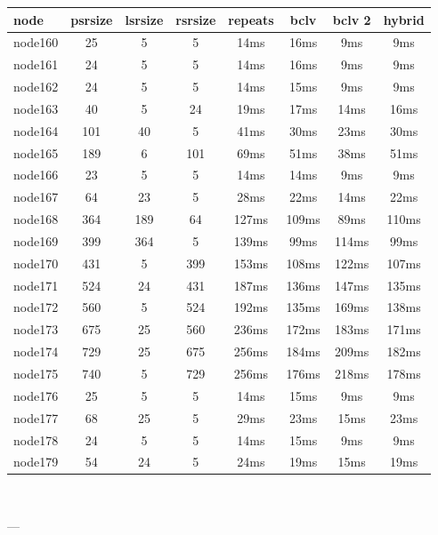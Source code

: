 \begin{tabular}{|l|c|c|c|c|c|c|c|}
\hline node & psrsize & lsrsize & rsrsize   & repeats & bclv & bclv 2 & hybrid\\
    \hline node160 & 25 & 5 & 5 & 14ms & 16ms & 9ms & 9ms\\
    \hline node161 & 24 & 5 & 5 & 14ms & 16ms & 9ms & 9ms\\
    \hline node162 & 24 & 5 & 5 & 14ms & 15ms & 9ms & 9ms\\
    \hline node163 & 40 & 5 & 24 & 19ms & 17ms & 14ms & 16ms\\
    \hline node164 & 101 & 40 & 5 & 41ms & 30ms & 23ms & 30ms\\
    \hline node165 & 189 & 6 & 101 & 69ms & 51ms & 38ms & 51ms\\
    \hline node166 & 23 & 5 & 5 & 14ms & 14ms & 9ms & 9ms\\
    \hline node167 & 64 & 23 & 5 & 28ms & 22ms & 14ms & 22ms\\
    \hline node168 & 364 & 189 & 64 & 127ms & 109ms & 89ms & 110ms\\
    \hline node169 & 399 & 364 & 5 & 139ms & 99ms & 114ms & 99ms\\
    \hline node170 & 431 & 5 & 399 & 153ms & 108ms & 122ms & 107ms\\
    \hline node171 & 524 & 24 & 431 & 187ms & 136ms & 147ms & 135ms\\
    \hline node172 & 560 & 5 & 524 & 192ms & 135ms & 169ms & 138ms\\
    \hline node173 & 675 & 25 & 560 & 236ms & 172ms & 183ms & 171ms\\
    \hline node174 & 729 & 25 & 675 & 256ms & 184ms & 209ms & 182ms\\
    \hline node175 & 740 & 5 & 729 & 256ms & 176ms & 218ms & 178ms\\
    \hline node176 & 25 & 5 & 5 & 14ms & 15ms & 9ms & 9ms\\
    \hline node177 & 68 & 25 & 5 & 29ms & 23ms & 15ms & 23ms\\
    \hline node178 & 24 & 5 & 5 & 14ms & 15ms & 9ms & 9ms\\
    \hline node179 & 54 & 24 & 5 & 24ms & 19ms & 15ms & 19ms\\

\hline
\end{tabular} \

---


